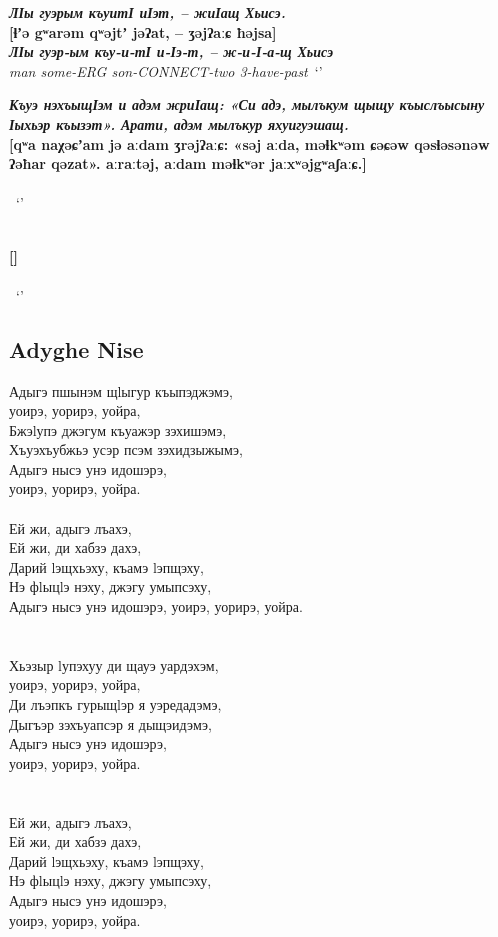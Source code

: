 \documentclass[a4paper,12pt]{book}
\newcommand{\1}[1]{\textbf{\emph{#1}}} %
\newcommand{\2}[1]{\textbf{[#1]}} %
\newcommand{\3}[1]{\fontsize{11pt}{0cm}\textbf{\emph{#1}}} %
\newcommand{\4}[1]{\fontsize{10pt}{0cm}\emph{#1}}	%
\newcommand{\5}[1]{\textbf{/#1/}} %
\newcommand{\6}[1]{\textbf{[#1]}} %
\newcommand{\7}[1]{\fontsize{12pt}{0cm}\emph{#1}} %
\newcommand{\8}[1]{\fontsize{12pt}{0cm}`#1'} %
\newcommand{\9}[1]{\fontsize{12pt}{0cm}(lit. `#1')} %
\begin{document}
\begin{exe}
\ex
\1{ЛӀы гуэрым къуитӀ иӀэт, – жиӀащ Хьисэ.}\\
\2{ɬʼə gʷarəm qʷəjtʼ jəʔat, – ʒəjʔaːɕ ħəjsa}\\
\3{ЛӀы гуэр-ым къу-и-тӀ и-Ӏэ-т, – ж-и-Ӏ-а-щ Хьисэ}\\
\4{man some-ERG son-CONNECT-two 3-have-past}\
\trans \8{}

\ex
\1{Къуэ нэхъыщӀэм и адэм жриӀащ: «Си адэ, мылъкум щыщу къыслъысыну Ӏыхьэр къызэт». Арати, адэм мылъкур яхуигуэшащ.}\\
\2{qʷa naχəɕʼam jə aːdam ʒrəjʔaːɕ: «səj aːda, məɬkʷəm ɕəɕəw qəsɬəsənəw ʔəħar qəzat». aːraːtəj, aːdam məɬkʷər jaːxʷəjgʷaʃaːɕ.}\\
\3{}\\
\4{}\
\trans \8{}


\ex
\1{}\\
\2{}\\
\3{}\\
\4{}\
\trans \8{}
\end{exe}


\subsection{Adyghe Nise}

Адыгэ пшынэм щlыгур къыпэджэмэ, \\
уоирэ, уорирэ, уойра,\\
Бжэlупэ джэгум къуажэр зэхишэмэ,\\
Хъуэхъубжьэ усэр псэм зэхидзыжымэ,\\
Адыгэ нысэ унэ идошэрэ, \\
уоирэ, уорирэ, уойра.\\
\\
Ей жи, адыгэ лъахэ,\\
Ей жи, ди хабзэ дахэ,\\
Дарий lэщхьэху, къамэ lэпщэху,\\
Нэ фlыцlэ нэху, джэгу умыпсэху,\\
Адыгэ нысэ унэ идошэрэ, уоирэ, уорирэ, уойра.\\
\\\\
Хьэзыр lупэхуу ди щауэ уардэхэм,\\
уоирэ, уорирэ, уойра,\\
Ди лъэпкъ гурыщlэр я уэредадэмэ,\\
Дыгъэр зэхъуапсэр я дыщэидэмэ,\\
Адыгэ нысэ унэ идошэрэ,\\
уоирэ, уорирэ, уойра.\\
\\\\
Ей жи, адыгэ лъахэ,\\
Ей жи, ди хабзэ дахэ,\\
Дарий lэщхьэху, къамэ lэпщэху,\\
Нэ фlыцlэ нэху, джэгу умыпсэху,\\
Адыгэ нысэ унэ идошэрэ,\\
уоирэ, уорирэ, уойра.\\
\end{document}
